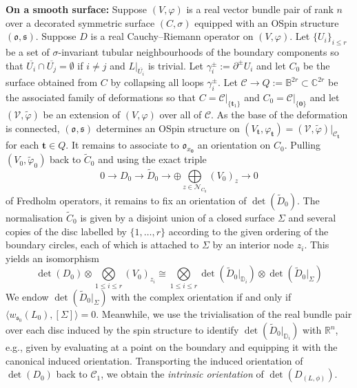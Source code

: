 \documentclass[11pt,psamsfonts, oneside, reqno]{amsart}
\newcommand{\cc}[1]{\overline{#1}}
\newcommand{\sub}{\subset}%
\newcommand{\emst}{\emptyset}
\newcommand{\lspan}[1]{\langle {#1}\rangle}
\newcommand{\del}{\partial}
\newcommand{\bB}{\mathbb{B}}
\newcommand{\bC}{\mathbb{C}}
\newcommand{\bD}{\mathbb{D}}
\newcommand{\bR}{\mathbb{R}}
\newcommand{\cC}{\mathcal{C}}
\newcommand{\cN}{\mathcal{N}}
\newcommand{\cV}{\mathcal{V}}
\newcommand{\fo}{\mathfrak{o}}
\newcommand{\fs}{\mathfrak{s}}
\newcommand{\wt}{\widetilde}
\theoremstyle{definition}
\theoremstyle{remark}
\numberwithin{equation}{section}
\begin{document}
\noindent\textbf{On a smooth surface:} Suppose $(V,\varphi)$ is a real vector bundle pair of rank $n$ over a decorated symmetric surface $(C,\sigma)$ equipped with an OSpin structure $(\fo,\fs)$. Suppose $D$ is a real Cauchy--Riemann operator on $(V,\varphi)$. Let $\{U_i\}_{i\leq r}$ be a set of $\sigma$-invariant tubular neighbourhoods of the boundary components so that $\cc{U_i}\cap \cc{{U_j}} = \emst$ if $i \neq j$ and $L|_{\cc{U_i}}$ is trivial. Let $\gamma_i^\pm := \del^\pm U_i$ and let $C_0$ be the surface obtained from $C$ by collapsing all loops $\gamma_i^\pm$. Let $\cC\to Q:= \bB^{2r} \sub \bC^{2r}$ be the associated family of deformations so that $C = \cC|_{\{\mathbf{t}_1\}}
$ and $C_0 =\cC|_{\{\mathbf{0}\}}$  and let $(\cV,\wt\varphi)$ be an extension of $(V,\varphi)$ over all of $\cC$. As the base of the deformation is connected, $(\fo,\fs)$ determines an OSpin structure on $(V_{\mathbf{t}},\varphi_{\mathbf{t}}) = (\cV,\wt\varphi)|_{\cC_{\mathbf{t}}}$ for each $\mathbf{t}\in Q$. It remains to associate to $\fo_{x_{\mathbf{0}}}$ an orientation on $C_{0}$. Pulling $(V_0,\wt\varphi_0)$ back to $\wt C_0$ and using the exact triple 
$$0 \to D_0 \to \wt D_0 \to \oplus \bigoplus\limits_{z \in \cN_{C_0}} (V_{0})_z\to 0$$\noindent
of Fredholm operators, it remains to fix an orientation of $\det(\wt D_0)$. The normalisation $\wt C_0$ is given by a disjoint union of a closed surface $\Sigma$ and several copies of the disc labelled by $\{1,\dots,r\}$ according to the given ordering of the boundary circles, each of which is attached to $\Sigma$ by an interior node $z_i$. This yields an isomorphism 
\begin{equation}\label{eq:orientation-line-normalisation}
	\det(D_0)\otimes \bigotimes\limits_{1 \leq i \leq r} (V_{0})_{z_i}\cong \bigotimes\limits_{1 \leq i \leq r}\det(\wt D_0|_{\bD_i})\otimes \det(\wt D_0|_\Sigma) 
\end{equation}
 We endow $\det(\wt D_0|_\Sigma)$ with the complex orientation if and only if $\lspan{w_{\fs_0}(L_0),[\Sigma]} = 0$. Meanwhile, we use the trivialisation of the real bundle pair over each disc induced by the spin structure to identify $\det(\wt D_0|_{\bD_i})$ with $\bR^n$, e.g., given by evaluating at a point on the boundary and equipping it with the canonical induced orientation. Transporting the induced orientation of $\det(D_0)$ back to $\cC_1$, we obtain the \emph{intrinsic orientation} of $\det(D_{(L,\phi)})$.
\bigskip
\end{document}
